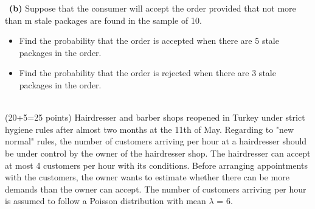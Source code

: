 \documentclass[a4 paper]{article}
\numberwithin{equation}{section}
\newcommand{\problem}[2]{~\\\fbox{\textbf{Problem #1}}\hfill (#2 points)\newline\newline}
\newcommand{\subproblem}[1]{~\newline\textbf{(#1)}}
\newcommand{\0}{\mathbf{0}}
\begin{document}
\subproblem{b} Suppose that the consumer will accept the order provided that not more than m stale packages are found in the sample of 10.
\begin{itemize}
	\item Find the probability that the order is accepted when there are 5 stale packages in the order.\\
	\newline {}
	\newline {}
	\newline {}
	\newline
	\item Find the probability that the order is rejected when there are 3 stale packages in the order.\\
	\newline {}
	\newline {}
	\newline {}
	\newline
\end{itemize}
\newpage
\problem{2:}{20+5=25}
Hairdresser and barber shops reopened in Turkey under strict hygiene rules after almost two months at the 11th of May. Regarding to "new normal" rules, the number of customers arriving per hour at a hairdresser should be under control by the owner of the hairdresser shop. The hairdresser can accept at most 4 customers per hour with its conditions.
Before arranging appointments with the customers, the owner wants to estimate whether there can be more demands than the owner can accept. The number of customers arriving per hour is assumed to follow
a Poisson distribution with mean $\lambda$ = 6.
\end{document}
